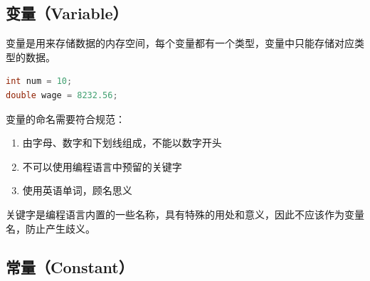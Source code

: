 \vspace{0.5cm}

\subsection{变量（Variable）}

变量是用来存储数据的内存空间，每个变量都有一个类型，变量中只能存储对应类型的数据。

\begin{lstlisting}[language=C]
int num = 10;
double wage = 8232.56;
\end{lstlisting}

\vspace{0.5cm}

变量的命名需要符合规范：

\begin{enumerate}
	\item 由字母、数字和下划线组成，不能以数字开头
	\item 不可以使用编程语言中预留的关键字
	\item 使用英语单词，顾名思义
\end{enumerate}

关键字是编程语言内置的一些名称，具有特殊的用处和意义，因此不应该作为变量名，防止产生歧义。\\

\begin{table}[H]
	\centering
	\caption{关键字}
\end{table}

\vspace{0.5cm}

\subsection{常量（Constant）}

